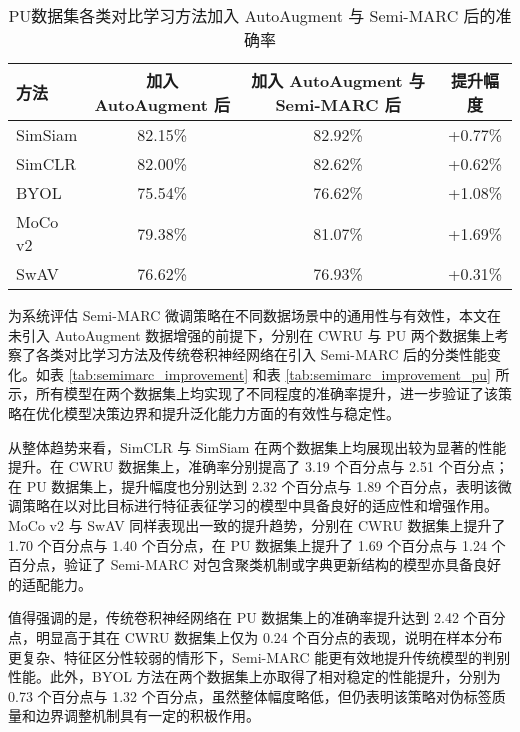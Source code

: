 \documentclass[master]{thesis-uestc}
\begin{document}
\begin{table}[h]
    \centering
    \caption{PU数据集各类对比学习方法加入 AutoAugment 与 Semi-MARC 后的准确率}
    \renewcommand\arraystretch{1.2}
    \begin{tabular}{lccc}
        \toprule
        方法 & 加入 AutoAugment 后 & 加入 AutoAugment 与 Semi-MARC 后 & 提升幅度 \\
        \midrule
        SimSiam & 82.15\% & 82.92\% & +0.77\% \\
        SimCLR  & 82.00\% & 82.62\% & +0.62\% \\
        BYOL    & 75.54\% & 76.62\% & +1.08\% \\
        MoCo v2 & 79.38\% & 81.07\% & +1.69\% \\
        SwAV    & 76.62\% & 76.93\% & +0.31\% \\
        \bottomrule
    \end{tabular}
    \label{tab:autoaugment_semimarc_accuracy_estimate_pu}
\end{table}

为系统评估 Semi-MARC 微调策略在不同数据场景中的通用性与有效性，本文在未引入 AutoAugment 数据增强的前提下，分别在 CWRU 与 PU 两个数据集上考察了各类对比学习方法及传统卷积神经网络在引入 Semi-MARC 后的分类性能变化。如表 \ref{tab:semimarc_improvement} 和表 \ref{tab:semimarc_improvement_pu} 所示，所有模型在两个数据集上均实现了不同程度的准确率提升，进一步验证了该策略在优化模型决策边界和提升泛化能力方面的有效性与稳定性。

从整体趋势来看，SimCLR 与 SimSiam 在两个数据集上均展现出较为显著的性能提升。在 CWRU 数据集上，准确率分别提高了 3.19 个百分点与 2.51 个百分点；在 PU 数据集上，提升幅度也分别达到 2.32 个百分点与 1.89 个百分点，表明该微调策略在以对比目标进行特征表征学习的模型中具备良好的适应性和增强作用。MoCo v2 与 SwAV 同样表现出一致的提升趋势，分别在 CWRU 数据集上提升了 1.70 个百分点与 1.40 个百分点，在 PU 数据集上提升了 1.69 个百分点与 1.24 个百分点，验证了 Semi-MARC 对包含聚类机制或字典更新结构的模型亦具备良好的适配能力。

值得强调的是，传统卷积神经网络在 PU 数据集上的准确率提升达到 2.42 个百分点，明显高于其在 CWRU 数据集上仅为 0.24 个百分点的表现，说明在样本分布更复杂、特征区分性较弱的情形下，Semi-MARC 能更有效地提升传统模型的判别性能。此外，BYOL 方法在两个数据集上亦取得了相对稳定的性能提升，分别为 0.73 个百分点与 1.32 个百分点，虽然整体幅度略低，但仍表明该策略对伪标签质量和边界调整机制具有一定的积极作用。
\end{document}
